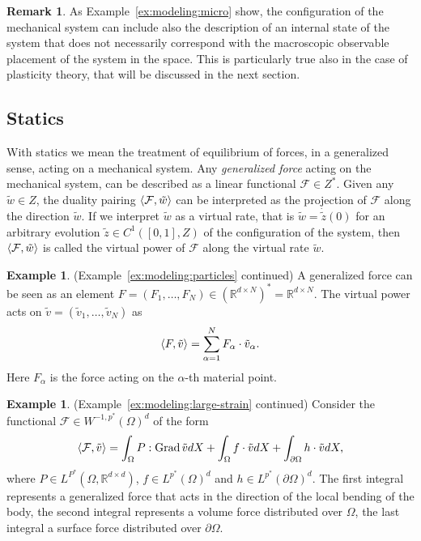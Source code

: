 \documentclass[a4paper,10pt,twoside]{amsbook}
\numberwithin{section}{chapter}
\numberwithin{equation}{chapter}
\theoremstyle{definition}
\newtheorem{rmk}[prop]{Remark}
\newtheorem{ex}[prop]{Example}
\DeclareMathOperator{\Grad}{Grad}
\DeclarePairedDelimiter{\dual}{\langle}{\rangle}
\begin{document}
\begin{rmk}
As Example~\ref{ex:modeling:micro} show, the configuration of the mechanical system can include also the description of an internal state of the system that does not necessarily correspond with the macroscopic observable placement of the system in the space. This is particularly true also in the case of plasticity theory, that will be discussed in the next section.
\end{rmk}

\subsection{Statics} With statics we mean the treatment of equilibrium of forces, in a generalized sense, acting on a mechanical system. Any \emph{generalized force} acting on the mechanical system, can be described as a linear functional $\mathcal{F}\in Z^*$. Given any $\tilde w\in Z$, the duality pairing $\dual{\mathcal{F},\tilde w}$ can be interpreted as the projection of $\mathcal{F}$ along the direction $\tilde w$. If we interpret $\tilde w$ as a virtual rate, that is $\tilde w=\dot{\tilde z}(0)$ for an arbitrary evolution $\tilde{z}\in C^1([0,1],Z)$ of the configuration of the system, then $\dual{\mathcal{F},\tilde w}$ is called the virtual power of $\mathcal{F}$ along the virtual rate $\tilde{w}$.
\begin{ex}(Example~\ref{ex:modeling:particles} continued)
\label{ex:modeling:particles-continued}
A generalized force can be seen as an element $F=(F_1,\dots,F_N)\in(\mathbb{R}^{d\times N})^*=\mathbb{R}^{d\times N}$. The virtual power acts on $\tilde v=(\tilde v_1,\dots,\tilde v_N)$ as
\[
\dual{F,\tilde v}=\sum_{\alpha=1}^NF_\alpha\cdot\tilde v_\alpha.
\]
Here $F_\alpha$ is the force acting on the $\alpha$-th material point.
\end{ex}
\begin{ex}(Example~\ref{ex:modeling:large-strain} continued)
Consider the functional $\mathcal{F}\in W^{-1,p^*}(\Omega)^d$ of the form
\[
\dual{\mathcal{F},\tilde v}=\int_\Omega P:\Grad\tilde vdX+\int_\Omega f\cdot\tilde vdX+\int_{\partial\Omega}h\cdot\tilde vdX,
\]
where $P\in L^{P^*}(\Omega,\mathbb{R}^{d\times d})$, $f\in L^{p^*}(\Omega)^d$ and $h\in L^{p^*}(\partial\Omega)^d$. The first integral represents a generalized force that acts in the direction of the local bending of the body, the second integral represents a volume force distributed over $\Omega$, the last integral a surface force distributed over $\partial\Omega$.
\end{ex}
\end{document}
